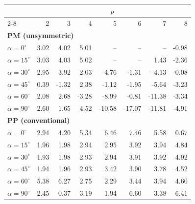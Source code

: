 \begin{tabular}{lrrrrrrr}
\toprule
& \multicolumn{7}{c}{$p$}\\
\cmidrule(lr){2-8}
 & 2 & 3 & 4 & 5 & 6 & 7 & 8\\
\midrule
\multicolumn{8}{l}{\textbf{PM (unsymmetric)}}\\
$\alpha=0^\circ$ & 3.02 & 4.02 & 5.01 & -- & -- & -- & -0.98\\
$\alpha=15^\circ$ & 3.03 & 4.03 & 5.02 & -- & -- & 1.43 & -2.36\\
$\alpha=30^\circ$ & 2.95 & 3.92 & 2.03 & -4.76 & -1.31 & -4.13 & -0.08\\
$\alpha=45^\circ$ & 0.39 & -1.32 & 2.38 & -1.12 & -1.95 & -5.64 & -3.23\\
$\alpha=60^\circ$ & 2.08 & 2.68 & -3.28 & -8.99 & -0.81 & -11.38 & -3.34\\
$\alpha=90^\circ$ & 2.60 & 1.65 & 4.52 & -10.58 & -17.07 & -11.81 & -4.91\\
\midrule
\multicolumn{8}{l}{\textbf{PP (conventional)}}\\
$\alpha=0^\circ$ & 2.94 & 4.20 & 5.34 & 6.46 & 7.46 & 5.58 & 0.67\\
$\alpha=15^\circ$ & 1.96 & 1.98 & 2.94 & 2.95 & 3.92 & 3.94 & 4.84\\
$\alpha=30^\circ$ & 1.93 & 1.98 & 2.93 & 2.94 & 3.91 & 3.92 & 4.92\\
$\alpha=45^\circ$ & 1.94 & 1.96 & 2.93 & 3.42 & 3.90 & 3.78 & 4.52\\
$\alpha=60^\circ$ & 5.38 & 6.27 & 2.75 & 2.29 & 3.44 & 3.94 & 4.60\\
$\alpha=90^\circ$ & 2.45 & 0.37 & 3.19 & 1.94 & 6.60 & 3.38 & 6.41\\
\bottomrule
\end{tabular}
